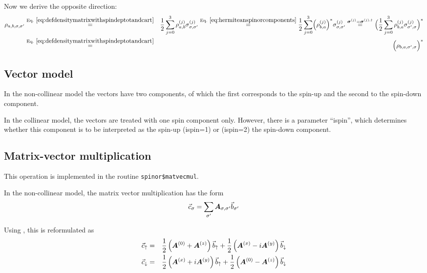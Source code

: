 \documentclass[11pt,a4paper]{report}
\begin{document}
Now we derive the opposite direction:
\begin{eqnarray}
\rho_{a,b,\sigma,\sigma'}
&\eqrel{eq:defdensitymatrixwithspindeptotandcart}{=}&
\frac{1}{2}\sum_{j=0}^3\rho^{(j)}_{a,b}\sigma^{(j)}_{\sigma,\sigma'}
\eqrel{eq:hermiteanspinorcomponents}{=}
\frac{1}{2}\sum_{j=0}^3\Bigl(\rho^{(j)}_{b,a}\Bigr)^*\sigma^{(j)}_{\sigma,\sigma'}
\stackrel{\mat{\sigma}^{(j)}=\mat{\sigma}^{(j),\dagger}}{=}
\Bigl(\frac{1}{2}\sum_{j=0}^3\rho^{(j)}_{b,a}\sigma^{(j)}_{\sigma',\sigma}\Bigr)^*
\nonumber\\
&\eqrel{eq:defdensitymatrixwithspindeptotandcart}{=}&
\Bigl(\rho_{b,a,\sigma',\sigma}\Bigr)^*
\end{eqnarray}


\subsection{Vector model}
In the non-collinear model the vectors have two components, of which
the first corresponds to the spin-up and the second to the spin-down
component.

In the collinear model, the vectors are treated with one spin
component only. However, there is a parameter ``ispin'', which
determines whether this component is to be interpreted as the spin-up
(ispin=1) or (ispin=2) the spin-down component.

\subsection{Matrix-vector multiplication}
This operation is implemented in the routine
\verb|spinor$matvecmul|.

In the non-collinear model, the matrix vector multiplication has the form
\begin{eqnarray} 
\vec{c}_\sigma=\sum_{\sigma'}\bm{A}_{\sigma,\sigma'}\vec{b}_{\sigma'}
\end{eqnarray}

Using , this is reformulated as
\begin{eqnarray}
\vec{c}_\uparrow&=&
\frac{1}{2}\left(\bm{A}^{(0)}+\bm{A}^{(z)}\right)\vec{b}_\uparrow
+\frac{1}{2}\left(\bm{A}^{(x)}-i\bm{A}^{(y)}\right)\vec{b}_\downarrow
\nonumber\\
\vec{c}_\downarrow&=&
\frac{1}{2}\left(\bm{A}^{(x)}+i\bm{A}^{(y)}\right)\vec{b}_\uparrow
+\frac{1}{2}\left(\bm{A}^{(0)}-\bm{A}^{(z)}\right)\vec{b}_\downarrow
\end{eqnarray}
\end{document}
